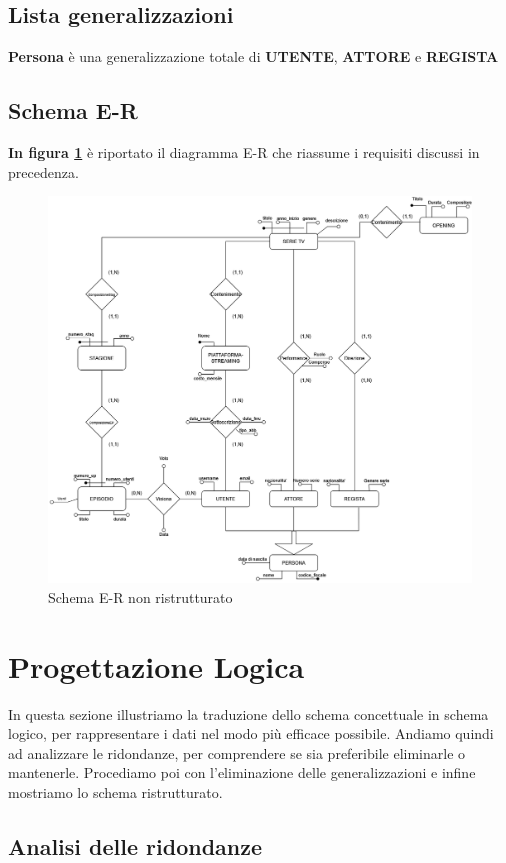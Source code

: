 \documentclass[12pt,a4paper]{article}
\begin{document}
\subsection{Lista generalizzazioni}
\textbf{Persona} è una generalizzazione totale di \textbf{UTENTE}, \textbf{ATTORE} e \textbf{REGISTA} 

\subsection{Schema E-R}
\textbf{In figura \ref{fig:no-ristrutt}} è riportato il diagramma E-R che riassume i requisiti discussi in precedenza.
\begin{figure}[h]
    \centering
    \includegraphics[scale=0.4]{schema-no-ristrutt.png}
    \caption{Schema E-R non ristrutturato}
    \label{fig:no-ristrutt}
\end{figure}
\section{Progettazione Logica}
In questa sezione illustriamo la traduzione dello schema concettuale in schema logico, per rappresentare i dati nel modo più efficace possibile. 
Andiamo quindi ad analizzare le ridondanze, per comprendere se sia preferibile eliminarle o mantenerle. 
Procediamo poi con l'eliminazione delle generalizzazioni e infine mostriamo lo schema ristrutturato.
\subsection{Analisi delle ridondanze}
\end{document}
